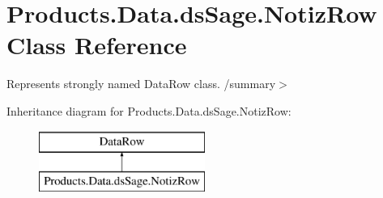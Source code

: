 \hypertarget{class_products_1_1_data_1_1ds_sage_1_1_notiz_row}{}\section{Products.\+Data.\+ds\+Sage.\+Notiz\+Row Class Reference}
\label{class_products_1_1_data_1_1ds_sage_1_1_notiz_row}


Represents strongly named Data\+Row class. /summary$>$  


Inheritance diagram for Products.\+Data.\+ds\+Sage.\+Notiz\+Row\+:\begin{figure}[H]
\begin{center}
\leavevmode
\includegraphics[height=2.000000cm]{class_products_1_1_data_1_1ds_sage_1_1_notiz_row}
\end{center}
\end{figure}
